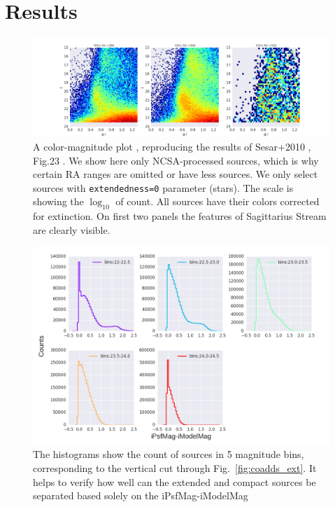 \documentclass[fleqn,usenatbib]{mnras}  %
\begin{document}
\section{Results}
\label{sec:results}


\begin{figure}
\label{fig:colors_example}
\includegraphics[width=\textwidth]{Fig_g-i_vs_i_ra_310-360hist_n_50row_ext_0.png}
\cprotect\caption{A color-magnitude plot , reproducing the results of Sesar+2010 , Fig.23 .  We show here only NCSA-processed sources, which is why certain RA ranges are omitted or have less sources. We only select sources with \verb|extendedness=0| parameter (stars).  The scale is showing the $\log_{10}$ of count. All sources have their  colors corrected for extinction. On first two panels the features of Sagittarius Stream are clearly visible. }
\end{figure}
% 



\begin{figure}
\label{fig:coadds_ext_hist}
 \includegraphics[width=\textwidth]{Extendedness_coadd_histograms.png}
 \caption{The histograms show the count of sources in 5 magnitude bins, corresponding to the vertical cut through Fig.~\ref{fig:coadds_ext}. It helps to verify how well can the extended and compact sources be separated based solely on the iPsfMag-iModelMag}
\end{figure}
\end{document}
